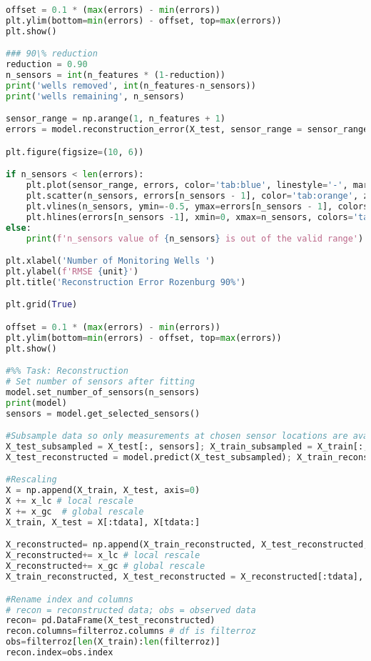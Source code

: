 \begin{lstlisting}[language=Python]
offset = 0.1 * (max(errors) - min(errors))
plt.ylim(bottom=min(errors) - offset, top=max(errors))
plt.show()

### 90\% reduction 
reduction = 0.90
n_sensors = int(n_features * (1-reduction))
print('wells removed', int(n_features-n_sensors))
print('wells remaining', n_sensors)

sensor_range = np.arange(1, n_features + 1)
errors = model.reconstruction_error(X_test, sensor_range = sensor_range)

plt.figure(figsize=(10, 6))

if n_sensors < len(errors): 
    plt.plot(sensor_range, errors, color='tab:blue', linestyle='-', marker='')
    plt.scatter(n_sensors, errors[n_sensors - 1], color='tab:orange', zorder=5)
    plt.vlines(n_sensors, ymin=-0.5, ymax=errors[n_sensors - 1], colors='tab:orange', linestyle='--', linewidth=2.0, label='Selected number of wells')
    plt.hlines(errors[n_sensors -1], xmin=0, xmax=n_sensors, colors='tab:orange', linestyle='--', linewidth=2.0)
else: 
    print(f'n_sensors value of {n_sensors} is out of the valid range')

plt.xlabel('Number of Monitoring Wells ')
plt.ylabel(f'RMSE {unit}')
plt.title('Reconstruction Error Rozenburg 90%')

plt.grid(True)

offset = 0.1 * (max(errors) - min(errors))
plt.ylim(bottom=min(errors) - offset, top=max(errors))
plt.show()

#%% Task: Reconstruction
# Set number of sensors after fitting
model.set_number_of_sensors(n_sensors)
print(model)
sensors = model.get_selected_sensors()

#Subsample data so only measurements at chosen sensor locations are available
X_test_subsampled = X_test[:, sensors]; X_train_subsampled = X_train[:, sensors]
X_test_reconstructed = model.predict(X_test_subsampled); X_train_reconstructed = model.predict(X_train_subsampled)

#Rescaling
X = np.append(X_train, X_test, axis=0)
X += x_lc # local rescale
X += x_gc  # global rescale
X_train, X_test = X[:tdata], X[tdata:]

X_reconstructed= np.append(X_train_reconstructed, X_test_reconstructed, axis=0) # appending in one array
X_reconstructed+= x_lc # local rescale
X_reconstructed+= x_gc # global rescale
X_train_reconstructed, X_test_reconstructed = X_reconstructed[:tdata], X_reconstructed[tdata:] # splitting in train and test set

#Rename index and columns 
# recon = reconstructed data; obs = observed data
recon= pd.DataFrame(X_test_reconstructed)
recon.columns=filterroz.columns # df is filterroz 
obs=filterroz[len(X_train):len(filterroz)]
recon.index=obs.index 


\end{lstlisting}
